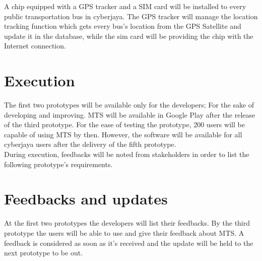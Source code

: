A chip equipped with a GPS tracker and a SIM card will be installed to every public transportation bus in cyberjaya. The GPS tracker will manage the location tracking function which gets every bus’s location from the GPS  Satellite and update it in the database, while the sim card will be providing the chip with the Internet connection.\\

\section{Execution}
The first two prototypes will be available only for the developers; For the sake of developing and improving. MTS will be available in Google Play after the release of the third prototype. For the ease of testing the prototype, 200 users will be capable of using MTS by then. However, the software will be available for all cyberjaya users after the delivery of the fifth prototype.\\

During execution, feedbacks will be noted from stakeholders in order to list the following prototype’s requirements.


\section{Feedbacks and updates}
At the first two prototypes the developers will list their feedbacks. By the third prototype the users will be able to use and give their feedback about MTS. A feedback is considered as soon as it’s received and the update will be held to the next prototype to be out.



\pagebreak
